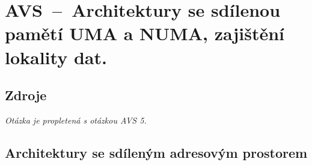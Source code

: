 

\graphicspath{{avs/architektury_se_sdilenou_pameti/figures}}


\chapter{AVS~--~Architektury se sdílenou pamětí UMA a NUMA, zajištění lokality dat.}


\section{Zdroje}

\begin{compactitem}
    \item {}
    \item {}
    \item {}
    \item {}
    \item \textit{Otázka je propletená s otázkou AVS 5.}
\end{compactitem}


\section{Architektury se sdíleným adresovým prostorem}

